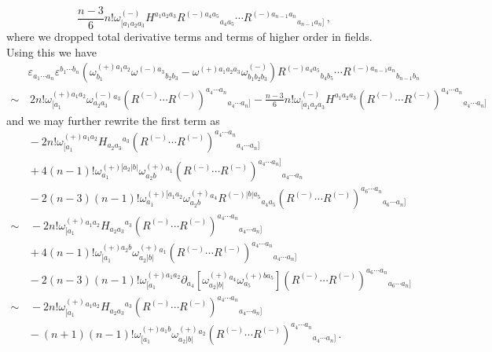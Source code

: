 \documentclass[a4paper,11pt]{article}
\begin{document}
\begin{equation}
\frac{n-3}{6}n!\omega^{(-)}_{[a_1a_2a_3}H^{a_1a_2a_3}R^{(-)a_4a_5}{}_{a_4a_5}\cdots R^{(-)a_{n-1}a_n}{}_{a_{n-1}a_n]}\,,
\end{equation}
where we dropped total derivative terms and terms of higher order in fields. Using this we have
\begin{equation}
\begin{aligned}
&\varepsilon_{a_1\cdots a_n}\varepsilon^{b_1\cdots b_n}
\left(\omega_{b_1}^{(+)a_1a_2}\omega^{(-)a_3}{}_{b_2b_3}-\omega^{(+)a_1a_2a_3}\omega^{(-)}_{b_1b_2b_3}\right)
R^{(-)a_4a_5}{}_{b_4b_5}\cdots R^{(-)a_{n-1}a_n}{}_{b_{n-1}b_n}
\\
\sim&\,{}
2n!\omega_{[a_1}^{(+)a_1a_2}\omega^{(-)}_{a_2a_3}{}^{a_3}\left(R^{(-)}\cdots R^{(-)}\right)^{a_4\cdots a_n}{}_{a_4\cdots a_n]}
-\frac{n-3}{6}n!\omega^{(-)}_{[a_1a_2a_3}H^{a_1a_2a_3}\left(R^{(-)}\cdots R^{(-)}\right)^{a_4\cdots a_n}{}_{a_4\cdots a_n]}
\end{aligned}
\end{equation}
and we may further rewrite the first term as
\begin{equation}
\begin{aligned}
&{}
-2n!\omega_{[a_1}^{(+)a_1a_2}H_{a_2a_3}{}^{a_3}\left(R^{(-)}\cdots R^{(-)}\right)^{a_4\cdots a_n}{}_{a_4\cdots a_n]}
\\&{}
+4(n-1)!\omega_{a_1}^{(+)[a_2|b|}\omega^{(+)}_{a_2b}{}^{a_1}\left(R^{(-)}\cdots R^{(-)}\right)^{a_4\cdots a_n]}{}_{a_4\cdots a_n}
\\&{}
-2(n-3)(n-1)!\omega_{a_1}^{(+)[a_1a_2}\omega^{(+)}_{a_2b}{}^{a_4}R^{(-)|b|a_5}{}_{a_4a_5}\left(R^{(-)}\cdots R^{(-)}\right)^{a_6\cdots a_n}{}_{a_6\cdots a_n]}
\\
\sim&\,{}
-2n!\omega^{(+)}_{[a_1}{}^{a_1a_2}H_{a_2a_3}{}^{a_3}\left(R^{(-)}\cdots R^{(-)}\right)^{a_4\cdots a_n}{}_{a_4\cdots a_n]}
\\&{}
+4(n-1)!\omega_{[a_1}^{(+)a_2b}\omega^{(+)}_{a_2|b|}{}^{a_1}\left(R^{(-)}\cdots R^{(-)}\right)^{a_4\cdots a_n}{}_{a_4\cdots a_n]}
\\&{}
-2(n-3)(n-1)!\omega_{[a_1}^{(+)a_1a_2}\partial_{a_4}\left[\omega^{(+)}_{a_2|b|}{}^{a_4}\omega_{a_5}^{(+)ba_5}\right]
\left(R^{(-)}\cdots R^{(-)}\right)^{a_6\cdots a_n}{}_{a_6\cdots a_n]}
\\
\sim&\,{}
-2n!\omega^{(+)}_{[a_1}{}^{a_1a_2}H_{a_2a_3}{}^{a_3}\left(R^{(-)}\cdots R^{(-)}\right)^{a_4\cdots a_n}{}_{a_4\cdots a_n]}
\\&{}
-(n+1)(n-1)!\omega_{[a_1}^{(+)a_1b}\omega^{(+)}_{a_2|b|}{}^{a_2}\left(R^{(-)}\cdots R^{(-)}\right)^{a_4\cdots a_n}{}_{a_4\cdots a_n]}\,.
\end{aligned}
\end{equation}
\end{document}
